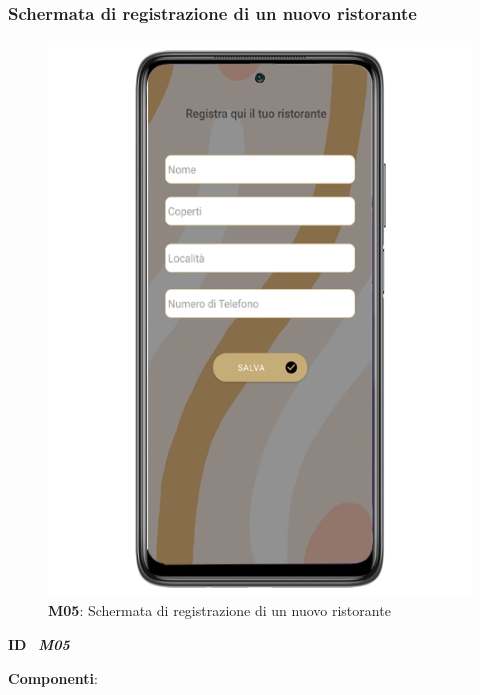         \subsubsection{Schermata di registrazione di un nuovo ristorante}
        \begin{figure}[H]
            \centering
            \includegraphics[scale=2]{assets/Mockup/Mockup_SaveResturant.png}
            \caption{\textbf{M05}: Schermata di registrazione di un nuovo ristorante}\label{fig:Mockup_AddResturant}
        \end{figure}
        \begin{flushleft}
            \textbf{ID} \ \Large{\textit{\textbf{M05}}}
        \end{flushleft}
        \textbf{Componenti}:


